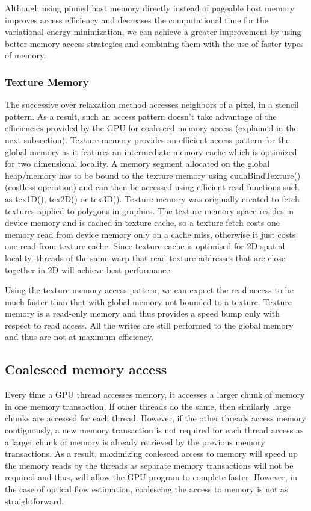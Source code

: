 \documentclass[english]{article}
\begin{document}
	Although using pinned host memory directly instead of pageable host memory improves access efficiency and decreases the computational time for the variational energy minimization, we can achieve a greater improvement by using better memory access strategies and combining them with the use of faster types of memory.

	\subsubsection{Texture Memory}
	The successive over relaxation method accesses neighbors of a pixel, in a stencil pattern. As a result, such an access pattern doesn’t take advantage of the efficiencies provided by the GPU for coalesced memory access (explained in the next subsection). Texture memory provides an efficient access pattern for the global memory as it features an intermediate memory cache which is optimized for two dimensional locality. A memory segment allocated on the global heap/memory has to be bound to the texture memory using cudaBindTexture() (costless operation) and can then be accessed using efficient read functions such as tex1D(), tex2D() or tex3D(). Texture memory was originally created to fetch textures applied to polygons in graphics. The texture memory space resides in device memory and is cached in texture cache, so a texture fetch costs one memory read from device memory only on a cache miss, otherwise it just costs one read from texture cache. Since texture cache is optimised for 2D spatial locality, threads of the same warp that read texture addresses that are close together in 2D will achieve best performance. 
	
	\pagebreak 

	Using the texture memory access pattern, we can expect the read access to be much faster than that with global memory not bounded to a texture. Texture memory is a read-only memory and thus provides a speed bump only with respect to read access. All the writes are still performed to the global memory and thus are not at maximum efficiency. 

	\subsection{Coalesced memory access}
	Every time a GPU thread accesses memory, it accesses a larger chunk of memory in one memory transaction. If other threads do the same, then similarly large chunks are accessed for each thread. However, if the other threads access memory contiguously, a new memory transaction is not required for each thread access as a larger chunk of memory is already retrieved by the previous memory transactions. As a result, maximizing coalesced access to memory will speed up the memory reads by the threads as separate memory transactions will not be required and thus, will allow the GPU program to complete faster. However, in the case of optical flow estimation, coalescing the access to memory is not as straightforward. 
\end{document}
